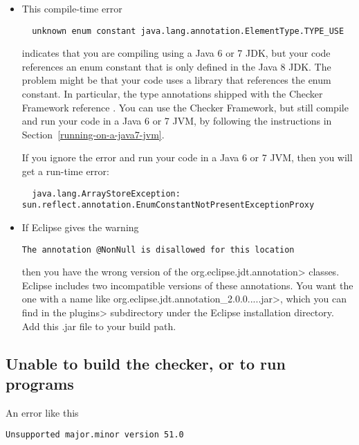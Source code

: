 \begin{itemize}
\item
This compile-time error

\begin{Verbatim}
  unknown enum constant java.lang.annotation.ElementType.TYPE_USE
\end{Verbatim}

\noindent
indicates that you are compiling using a Java 6 or 7 JDK, but your code
references an enum constant that is only defined in the Java 8 JDK.  The
problem might be that your code uses a library that references the enum
constant.  In particular, the type annotations shipped with the Checker
Framework reference 
.  You can use the Checker
Framework, but still compile and run your code in a Java 6 or 7 JVM, by
following the instructions in Section~\ref{running-on-a-java7-jvm}.

If you ignore the error and run your code in a Java 6 or 7 JVM, then you will get a run-time error:

\begin{Verbatim}
  java.lang.ArrayStoreException: sun.reflect.annotation.EnumConstantNotPresentExceptionProxy
\end{Verbatim}


\item
If Eclipse gives the warning

\begin{Verbatim}
The annotation @NonNull is disallowed for this location
\end{Verbatim}

\noindent
then you have the wrong version of the \<org.eclipse.jdt.annotation>
classes.  Eclipse includes two incompatible versions of these annotations.
You want the one with a name like
\<org.eclipse.jdt.annotation\_2.0.0.....jar>, which you can find in the
\<plugins> subdirectory under the Eclipse installation directory.
Add this .jar file to your build path.


\end{itemize}


\subsection{Unable to build the checker, or to run programs\label{common-problems-running-java}}

An error like this

\begin{Verbatim}
Unsupported major.minor version 51.0
\end{Verbatim}

